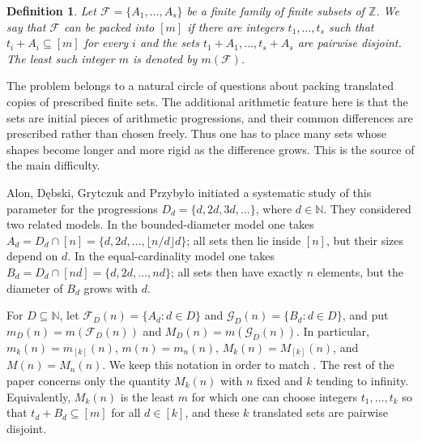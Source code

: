 \documentclass[twoside,12pt]{article}
\numberwithin{equation}{section}
\newtheorem{definition}[theorem]{Definition}
\newcommand{\N}{\mathbb{N}}
\newcommand{\Z}{\mathbb{Z}}
\begin{document}
\begin{definition}
Let $\mathcal F=\{A_1,\ldots,A_s\}$ be a finite family of finite subsets of
$\Z$.  We say that $\mathcal F$ can be packed into $[m]$ if there are integers
$t_1,\ldots,t_s$ such that $t_i+A_i\subseteq[m]$ for every $i$ and the sets
$t_1+A_1,\ldots,t_s+A_s$ are pairwise disjoint.  The least such integer $m$ is
denoted by $m(\mathcal F)$.
\end{definition}

The problem belongs to a natural circle of questions about packing translated
copies of prescribed finite sets.  The additional arithmetic feature here is
that the sets are initial pieces of arithmetic progressions, and their common
differences are prescribed rather than chosen freely.  Thus one has to place
many sets whose shapes become longer and more rigid as the difference grows.
This is the source of the main difficulty.

Alon, D\k{e}bski, Grytczuk and Przyby\l{}o \cite{ADGP} initiated a systematic
study of this parameter for the progressions $D_d=\{d,2d,3d,\ldots\}$,
where $d\in\N$.  They considered two related models.  In the bounded-diameter
model one takes $A_d=D_d\cap[n]=\{d,2d,\ldots,\lfloor n/d\rfloor d\}$; all
sets then lie inside $[n]$, but their sizes depend on $d$.  In the
equal-cardinality model one takes $B_d=D_d\cap[nd]=\{d,2d,\ldots,nd\}$; all
sets then have exactly $n$ elements, but the diameter of $B_d$ grows with
$d$.

For $D\subseteq\N$, let $\mathcal F_D(n)=\{A_d:d\in D\}$ and
$\mathcal G_D(n)=\{B_d:d\in D\}$, and put $m_D(n)=m(\mathcal F_D(n))$ and
$M_D(n)=m(\mathcal G_D(n))$.  In particular, $m_k(n)=m_{[k]}(n)$,
$m(n)=m_n(n)$, $M_k(n)=M_{[k]}(n)$, and $M(n)=M_n(n)$.  We keep this notation
in order to match \cite{ADGP}.  The rest of the paper concerns only the
quantity $M_k(n)$ with $n$ fixed and $k$ tending to infinity.  Equivalently,
$M_k(n)$ is the least $m$ for which one can choose integers $t_1,\ldots,t_k$
so that $t_d+B_d\subseteq[m]$ for all $d\in[k]$, and these $k$ translated
sets are pairwise disjoint.
\end{document}
